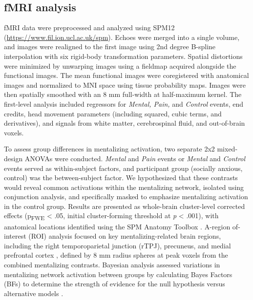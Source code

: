 \subsection{fMRI analysis}
fMRI data were preprocessed and analyzed using SPM12 (\url{https://www.fil.ion.ucl.ac.uk/spm}). Echoes were merged into a single volume, and images were realigned to the first image using 2nd degree B-spline interpolation with six rigid-body transformation parameters. Spatial distortions were minimized by unwarping images using a fieldmap acquired alongside the functional images. The mean functional images were coregistered with anatomical images and normalized to MNI space using tissue probability maps. Images were then spatially smoothed with an 8 mm full-width at half-maximum kernel. The first-level analysis included regressors for \textit{Mental, Pain,} and \textit{Control} events, end credits, head movement parameters (including squared, cubic terms, and derivatives), and signals from white matter, cerebrospinal fluid, and out-of-brain voxels.

To assess group differences in mentalizing activation, two separate 2x2 mixed-design ANOVAs were conducted. \textit{Mental} and \textit{Pain} events or \textit{Mental} and \textit{Control} events served as within-subject factors, and participant group (socially anxious, control) was the between-subject factor. We hypothesized that these contrasts would reveal common activations within the mentalizing network, isolated using conjunction analysis, and specifically masked to emphasize mentalizing activation in the control group. Results are presented as whole-brain cluster-level corrected effects (p\textsubscript{FWE} < .05, initial cluster-forming threshold at \textit{p} < .001), with anatomical locations identified using the SPM Anatomy Toolbox \citep{eickhoff2005}. A-region of-interest (ROI) analysis focused on key mentalizing-related brain regions, including the right temporoparietal junction (rTPJ), precuneus, and medial prefrontal cortex \citep[mPFC; ][]{schurz2014}, defined by 8 mm radius spheres at peak voxels from the combined mentalizing contrasts. Bayesian analysis assessed variations in mentalizing network activation between groups by calculating Bayes Factors (BFs) to determine the strength of evidence for the null hypothesis versus alternative models \citep{jasp2022}. 


